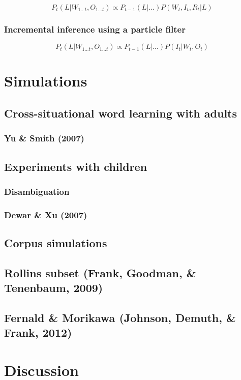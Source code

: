 \documentclass[man,noapacite]{apa2}
\begin{document}
\begin{equation}
P_t(L|W_{1...t}, O_{1...t}) \propto P_{t-1}(L | ...) P(W_t, I_t, R_t | L)
\end{equation}


\subsubsection{Incremental inference using a particle filter}

\begin{equation}
P_t(L|W_{1...t}, O_{1...t}) \propto P_{t-1}(L | ...) P(I_t | W_t, O_t)
\end{equation}

\section{Simulations}

\subsection{Cross-situational word learning with adults}

\subsubsection{Yu \& Smith (2007)}

\subsection{Experiments with children}

\subsubsection{Disambiguation}

\subsubsection{Dewar \& Xu (2007)}


\subsection{Corpus simulations}

\subsection{Rollins subset (Frank, Goodman, \& Tenenbaum, 2009)}

\subsection{Fernald \& Morikawa (Johnson, Demuth, \& Frank, 2012)}

\section{Discussion}

\newpage



\end{document}

